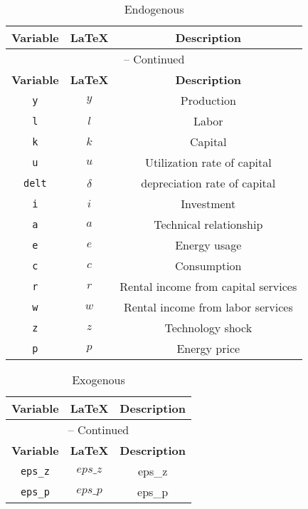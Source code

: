 \begin{center}
\begin{longtable}{ccc}
\caption{Endogenous}\\%
\hline%
\multicolumn{1}{c}{\textbf{Variable}} &
\multicolumn{1}{c}{\textbf{\LaTeX}} &
\multicolumn{1}{c}{\textbf{Description}}\\%
\hline\hline%
\endfirsthead
\multicolumn{3}{c}{{\tablename} \thetable{} -- Continued}\\%
\hline%
\multicolumn{1}{c}{\textbf{Variable}} &
\multicolumn{1}{c}{\textbf{\LaTeX}} &
\multicolumn{1}{c}{\textbf{Description}}\\%
\hline\hline%
\endhead
\texttt{y} & ${y}$ & Production\\
\texttt{l} & ${l}$ & Labor\\
\texttt{k} & ${k}$ & Capital\\
\texttt{u} & ${u}$ & Utilization rate of capital\\
\texttt{delt} & ${\delta}$ & depreciation rate of capital\\
\texttt{i} & ${i}$ & Investment\\
\texttt{a} & ${a}$ & Technical relationship\\
\texttt{e} & ${e}$ & Energy usage\\
\texttt{c} & ${c}$ & Consumption\\
\texttt{r} & ${r}$ & Rental income from capital services\\
\texttt{w} & ${w}$ & Rental income from labor services\\
\texttt{z} & ${z}$ & Technology shock\\
\texttt{p} & ${p}$ & Energy price\\
\hline%
\end{longtable}
\end{center}
\begin{center}
\begin{longtable}{ccc}
\caption{Exogenous}\\%
\hline%
\multicolumn{1}{c}{\textbf{Variable}} &
\multicolumn{1}{c}{\textbf{\LaTeX}} &
\multicolumn{1}{c}{\textbf{Description}}\\%
\hline\hline%
\endfirsthead
\multicolumn{3}{c}{{\tablename} \thetable{} -- Continued}\\%
\hline%
\multicolumn{1}{c}{\textbf{Variable}} &
\multicolumn{1}{c}{\textbf{\LaTeX}} &
\multicolumn{1}{c}{\textbf{Description}}\\%
\hline\hline%
\endhead
\texttt{eps\_z} & $eps\_z$ & eps\_z\\
\texttt{eps\_p} & $eps\_p$ & eps\_p\\
\hline%
\end{longtable}
\end{center}
